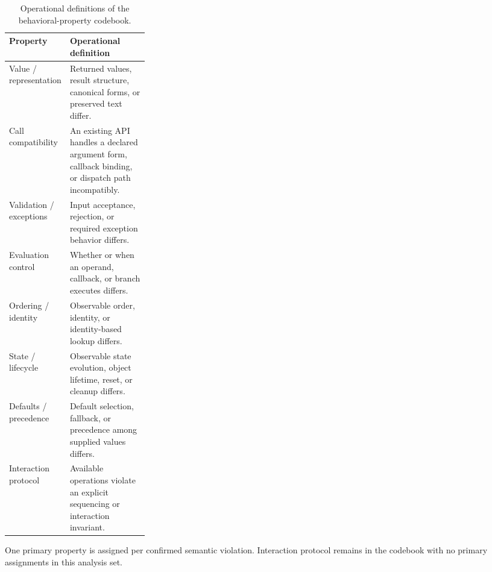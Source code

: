 \begin{table}[tbp]
  \centering
  \small
  \caption{Operational definitions of the behavioral-property codebook.}
  \label{tab:failure-analysis}
  \setlength{\tabcolsep}{4.0pt}
  \renewcommand{\arraystretch}{1.06}
  \begin{tabularx}{\linewidth}{@{}>{\raggedright\arraybackslash}p{0.27\linewidth}>{\raggedright\arraybackslash}X@{}}
    \toprule
    \textbf{Property} & \textbf{Operational definition} \\
    \midrule
    Value / representation & Returned values, result structure, canonical forms, or preserved text differ. \\
    Call compatibility & An existing API handles a declared argument form, callback binding, or dispatch path incompatibly. \\
    Validation / exceptions & Input acceptance, rejection, or required exception behavior differs. \\
    Evaluation control & Whether or when an operand, callback, or branch executes differs. \\
    Ordering / identity & Observable order, identity, or identity-based lookup differs. \\
    State / lifecycle & Observable state evolution, object lifetime, reset, or cleanup differs. \\
    Defaults / precedence & Default selection, fallback, or precedence among supplied values differs. \\
    Interaction protocol & Available operations violate an explicit sequencing or interaction invariant. \\
    \bottomrule
  \end{tabularx}
  \par\smallskip\begin{minipage}{\linewidth}\scriptsize
  One primary property is assigned per confirmed semantic violation. Interaction protocol remains in the codebook with no primary assignments in this analysis set.
  \end{minipage}
\end{table}
